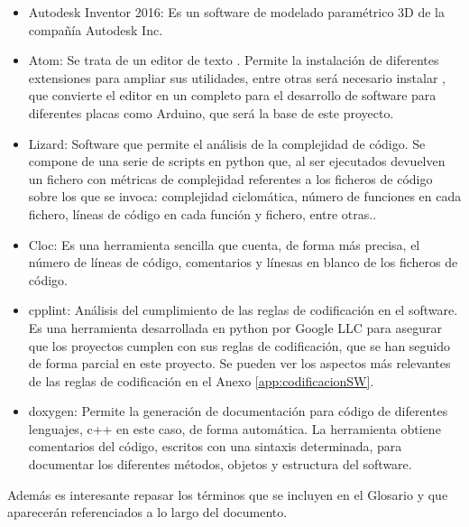 \begin{itemize}
    \item Autodesk Inventor 2016: Es un software de modelado paramétrico 3D de la compañía Autodesk Inc.
    \item Atom: Se trata de un editor de texto . Permite la instalación de diferentes extensiones para ampliar sus utilidades, entre otras será necesario instalar , que convierte el editor en un  completo para el desarrollo de software para diferentes placas como Arduino, que será la base de este proyecto.
    \item Lizard: Software que permite el análisis de la complejidad de código. Se compone de una serie de scripts en python que, al ser ejecutados devuelven un fichero con métricas de complejidad referentes a los ficheros de código sobre los que se invoca: complejidad ciclomática, número de funciones en cada fichero, líneas de código en cada función y fichero, entre otras..
    \item Cloc: Es una herramienta sencilla que cuenta, de forma más precisa, el número de líneas de código, comentarios y línesas en blanco de los ficheros de código.
    \item cpplint: Análisis del cumplimiento de las reglas de codificación en el software. Es una herramienta desarrollada en python por Google LLC para asegurar que los proyectos cumplen con sus reglas de codificación, que se han seguido de forma parcial en este proyecto. Se pueden ver los aspectos más relevantes de las reglas de codificación en el Anexo \ref{app:codificacionSW}.
    \item doxygen: Permite la generación de documentación para código de diferentes lenguajes, c++ en este caso, de forma automática. La herramienta obtiene comentarios del código, escritos con una sintaxis determinada, para documentar los diferentes métodos, objetos y estructura del software.
\end{itemize}

Además es interesante repasar los términos que se incluyen en el Glosario y que aparecerán referenciados a lo largo del documento. \completar
